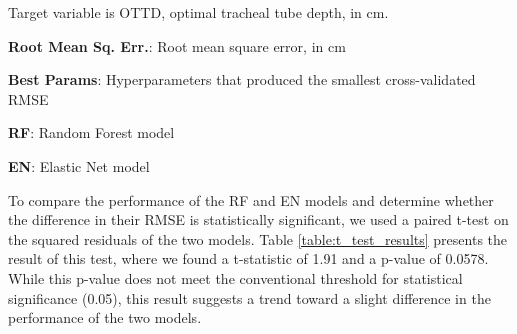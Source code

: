 \documentclass[11pt]{article}
\begin{document}
\begin{table}[h]
\caption{Performance summary of two Machine-Learning models}
\label{table:performance_summary}
\begin{threeparttable}
\renewcommand{\TPTminimum}{\linewidth}
\begin{tablenotes}
\footnotesize
\item Target variable is OTTD, optimal tracheal tube depth, in cm.
\item \textbf{Root Mean Sq. Err.}: Root mean square error, in cm
\item \textbf{Best Params}: Hyperparameters that produced the smallest cross-validated RMSE
\item \textbf{RF}: Random Forest model
\item \textbf{EN}: Elastic Net model
\end{tablenotes}
\end{threeparttable}
\end{table}


To compare the performance of the RF and EN models and determine whether the difference in their RMSE is statistically significant, we used a paired t-test on the squared residuals of the two models. Table \ref{table:t_test_results} presents the result of this test, where we found a t-statistic of 1.91 and a p-value of 0.0578. While this p-value does not meet the conventional threshold for statistical significance (0.05), this result suggests a trend toward a slight difference in the performance of the two models.
\end{document}
